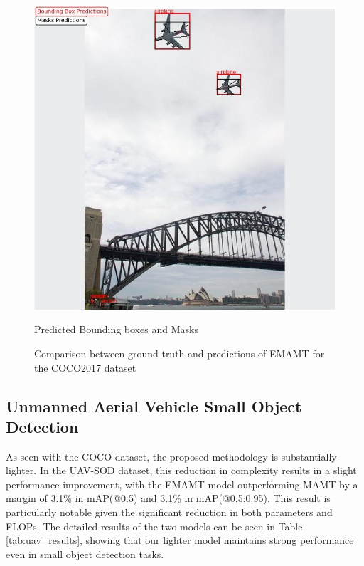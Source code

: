 \begin{figure}[!h]
\begin{minipage}{0.4\textwidth}
      \includegraphics[scale=0.35]{Figures/coco_predictions.jpg}
      \caption{Predicted Bounding boxes and Masks}
    \end{minipage}
    \caption{Comparison between ground truth and predictions of EMAMT for the COCO2017 dataset}
    \label{fig:coco-images}
\end{figure}


\subsection{Unmanned Aerial Vehicle Small Object Detection}

As seen with the COCO dataset, the proposed methodology is substantially lighter. In the UAV-SOD dataset, this reduction in complexity results in a slight 
performance improvement, with the EMAMT model outperforming MAMT by a margin of 3.1\% in mAP(@0.5) and 3.1\% in mAP(@0.5:0.95). This result is particularly 
notable given the significant reduction in both parameters and FLOPs. The detailed results of the two models can be seen in Table \ref{tab:uav_results}, 
showing that our lighter model maintains strong performance even in small object detection tasks.


